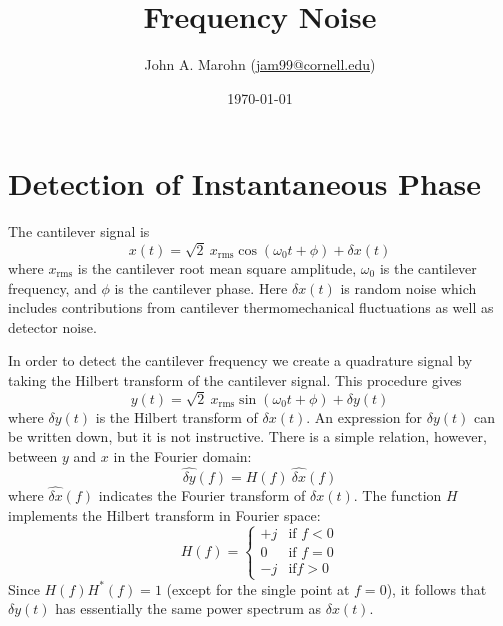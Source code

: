 \documentclass[twocolumn,pre,nobalancelastpage]{revtex4}
\begin{document}
\title{Frequency Noise}
\author {John A. Marohn (\href{mailto:jam99@cornell.edu}{jam99@cornell.edu})}
\date{\today}
\maketitle
\thispagestyle{fancy}

\section{Detection of Instantaneous Phase}

The cantilever signal is
\begin{equation}
\boxed{x(t) = \sqrt{2} \: x_{\text{rms}} \cos{(\omega_0 t + \phi)} + \delta x(t)} \label{Eq:x}
\end{equation}
where $x_{\text{rms}}$ is the cantilever root mean square amplitude, $\omega_0$ is the cantilever frequency, and $\phi$ is the cantilever phase.  Here $\delta x(t)$ is random noise which includes contributions from cantilever thermomechanical fluctuations as well as detector noise.

In order to detect the cantilever frequency we create a quadrature signal by taking the Hilbert transform of the cantilever signal.  This procedure gives
\begin{equation}
y(t) = \sqrt{2} \: x_{\text{rms}} \sin{(\omega_0 t + \phi)} + \delta y(t) \label{Eq:y}
\end{equation}
where $\delta y(t)$ is the Hilbert transform of $\delta x(t)$.  An expression for $\delta y(t)$ can be written down, but it is not instructive.  There is a simple relation, however, between $y$ and $x$ in the Fourier domain:
\begin{equation}
\widehat{\delta y}(f) = H(f) \: \widehat{\delta x}(f)
\end{equation}
where $\widehat{\delta x}(f)$ indicates the Fourier transform of $\delta x(t)$.  The function $H$ implements the Hilbert transform in Fourier space:
\begin{equation}
H(f) = \begin{cases}
+j & \text{if } f < 0 \\
0 & \text{if } f = 0 \\
-j & \text{if} f > 0
\end{cases}
\end{equation}
Since $H(f) H^{*}(f) = 1$ (except for the single point at $f=0$), it follows that $\delta y(t)$ has essentially the same power spectrum as $\delta x(t)$.
\end{document}
